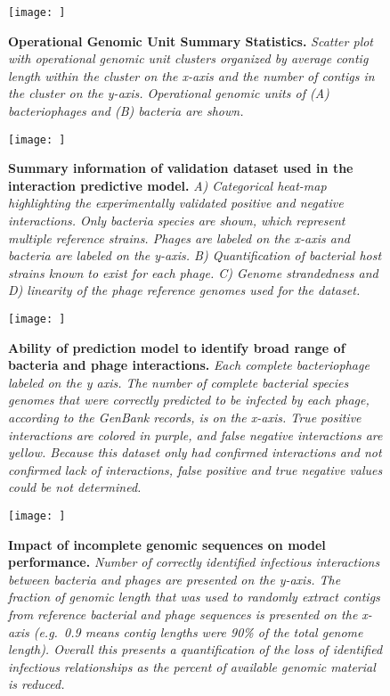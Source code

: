\documentclass[12pt,]{article}
\begin{document}
\newpage

\begin{figure}[htbp]
\centering
\texttt{[image: ]}
\caption{\textbf{Operational Genomic Unit Summary Statistics.}
\emph{Scatter plot with operational genomic unit clusters organized by
average contig length within the cluster on the x-axis and the number of
contigs in the cluster on the y-axis. Operational genomic units of (A)
bacteriophages and (B) bacteria are shown.}\label{ClusterStats}}
\end{figure}

\newpage

\begin{figure}[htbp]
\centering
\texttt{[image: ]}
\caption{\textbf{Summary information of validation dataset used in the
interaction predictive model.} \emph{A) Categorical heat-map
highlighting the experimentally validated positive and negative
interactions. Only bacteria species are shown, which represent multiple
reference strains. Phages are labeled on the x-axis and bacteria are
labeled on the y-axis. B) Quantification of bacterial host strains known
to exist for each phage. C) Genome strandedness and D) linearity of the
phage reference genomes used for the
dataset.}\label{ValidationOverview}}
\end{figure}

\newpage

\begin{figure}[htbp]
\centering
\texttt{[image: ]}
\caption{\textbf{Ability of prediction model to identify broad range of
bacteria and phage interactions.} \emph{Each complete bacteriophage
labeled on the y axis. The number of complete bacterial species genomes
that were correctly predicted to be infected by each phage, according to
the GenBank records, is on the x-axis. True positive interactions are
colored in purple, and false negative interactions are yellow. Because
this dataset only had confirmed interactions and not confirmed lack of
interactions, false positive and true negative values could be not
determined.}\label{secondval}}
\end{figure}

\newpage

\begin{figure}[htbp]
\centering
\texttt{[image: ]}
\caption{\textbf{Impact of incomplete genomic sequences on model
performance.} \emph{Number of correctly identified infectious
interactions between bacteria and phages are presented on the y-axis.
The fraction of genomic length that was used to randomly extract contigs
from reference bacterial and phage sequences is presented on the x-axis
(e.g.~0.9 means contig lengths were 90\% of the total genome length).
Overall this presents a quantification of the loss of identified
infectious relationships as the percent of available genomic material is
reduced.}\label{contigval}}
\end{figure}
\end{document}
